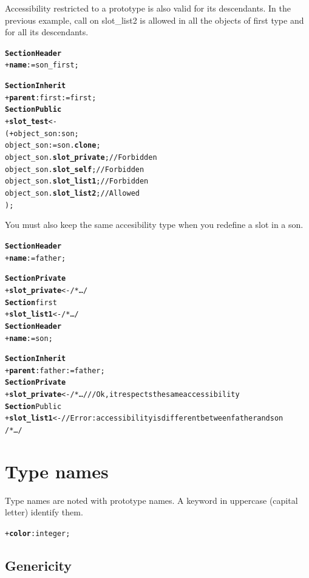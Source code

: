 \documentclass[11pt]{mybook}
\begin{document}
Accessibility restricted to a prototype is also valid for its descendants.
In the previous example, call on slot\_list2 is allowed in all the objects of {\sc{}first} type and for all its descendants.
\begin{alltt}
{\bf{}Section Header}
  + {\bf{}name} := {\sc{}son\_first};

{\bf{}Section Inherit}
  + {\bf{}parent}:{\sc{}first} := {\sc{}first};
{\bf{}Section Public}
  + {\bf{}slot\_test} <-
  ( + object\_son:{\sc{}son};
    object\_son := {\sc{}son}.{\bf{}clone};
    object\_son.{\bf{}slot\_private};          // Forbidden
    object\_son.{\bf{}slot\_self};             // Forbidden
    object\_son.{\bf{}slot\_list1};            // Forbidden
    object\_son.{\bf{}slot\_list2};            // Allowed
  );
\end{alltt}

You must also keep the same accesibility type when you redefine a slot in a son.

\begin{alltt} 
{\bf{}Section Header}
  + {\bf{}name} := {\sc{}father};

{\bf{}Section Private}
  + {\bf{}slot\_private} <- /* \ldots */
{\bf{}Section} {\sc{}first}
  + {\bf{}slot\_list1} <- /* \ldots */\\

{\bf{}Section Header}
  + {\bf{}name} := {\sc{}son};

{\bf{}Section Inherit}
  + {\bf{}parent}:{\sc{}father} := {\sc{}father};
{\bf{}Section Private}
  + {\bf{}slot\_private} <- /* \ldots */   // Ok, it respects the same accessibility
{\bf{}Section} Public
  + {\bf{}slot\_list1} <- // Error: accessibility is different between {\sc{}father} and {\sc{}son}
  /* \ldots */ 
\end{alltt}


\section{Type names}
\label{language_reference:type_names}
%
Type names are noted with prototype names.
A keyword in uppercase (capital letter) identify them.
\begin{alltt} 
  + {\bf{}color}:{\sc{}integer};
\end{alltt}
\subsection{Genericity}
\label{language_reference:type_names:genericity}
\end{document}

